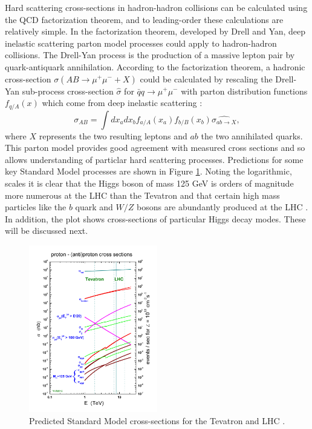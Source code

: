 Hard scattering cross-sections in hadron-hadron collisions can be calculated using the QCD factorization theorem, and to leading-order these calculations are relatively simple. In the factorization theorem, developed by Drell and Yan, deep inelastic scattering parton model processes could apply to hadron-hadron collisions. The Drell-Yan process is the production of a massive lepton pair by quark-antiquark annihilation. According to the factorization theorem, a hadronic cross-section $\sigma(AB\rightarrow \mu^+\mu^-+X)$ could be calculated by rescaling the Drell-Yan sub-process cross-section $\hat{\sigma}$ for $\bar{q}q\rightarrow\mu^+\mu^-$ with parton distribution functions $f_{q/A}(x)$ which come from deep inelastic scattering \cite{Campbell}:
\begin{equation}
\sigma_{AB} = \int dx_a dx_b f_{a/A}(x_a)f_{b/B}(x_b)\hat{\sigma_{ab\rightarrow X}},
\end{equation}
where $X$ represents the two resulting leptons and $ab$ the two annihilated quarks. This parton model provides good agreement with measured cross sections and so allows understanding of particlar hard scattering processes. Predictions for some key Standard Model processes are shown in Figure \ref{fig:crosssection}. Noting the logarithmic, scales it is clear that the Higgs boson of mass 125 GeV is orders of magnitude more numerous at the LHC than the Tevatron and that certain high mass particles like the $b$ quark and $W/Z$ bosons are abundantly produced at the LHC \cite{Campbell}. In addition, the plot shows cross-sections of particular Higgs decay modes. These will be discussed next.
 
\begin{figure}[H]
        \centering
    \includegraphics[width=0.5\textwidth] {Pictures/crosssections.jpg}\hspace{1cm}
    \caption{Predicted Standard Model cross-sections for the Tevatron and LHC \cite{Stirling}.}
    \label{fig:crosssection}
\end{figure}

